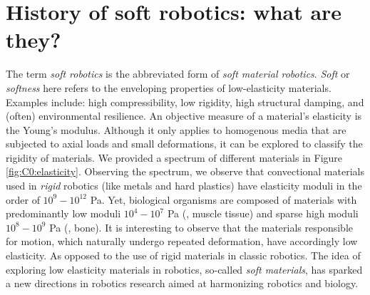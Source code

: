 \section{History of soft robotics: what are they?} 
\label{sec:intro:history}
The term \emph{soft robotics} is the abbreviated form of \emph{soft material robotics}. \textit{Soft} or \textit{softness}  here refers to the enveloping properties of low-elasticity materials. Examples include: high compressibility, low rigidity, high structural damping, and (often) environmental resilience. An objective measure of a material's elasticity is the Young's modulus. Although it only applies to homogenous media that are subjected to axial loads and small deformations, it can be explored to classify the rigidity of materials. We provided a spectrum of different materials in Figure \ref{fig:C0:elasticity}. Observing the spectrum, we observe that convectional materials used in \textit{rigid} robotics (like metals and hard plastics) have elasticity moduli in the order of $10^9 - 10^{12}$ \si{Pa}. Yet, biological organisms are composed of materials with predominantly low moduli $10^4 - 10^7$ \si{Pa} (\eg, muscle tissue) and sparse high moduli $10^8 - 10^9$ \si{Pa} (\eg, bone). It is interesting to observe that the materials responsible for motion, which naturally undergo repeated deformation, have accordingly low elasticity. As opposed to the use of rigid materials in classic robotics. The idea of exploring low elasticity materials in robotics, so-called \emph{soft materials}, has sparked a new directions in robotics research aimed at harmonizing robotics and biology. 

